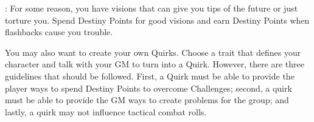 \begin{multicols}{2}
\begin{minipage}{.35\textwidth-2\columnsep}
\end{minipage} \pw \begin{ffcolpage}
: For some reason, you have visions that can give you tips of the future or just torture you. Spend Destiny Points for good visions and earn Destiny Points when flashbacks cause you trouble.
\end{ffcolpage} \pw \begin{ffcolpage}
You may also want to create your own Quirks. Choose a trait that defines your character and talk with your GM to turn into a Quirk. However, there are three guidelines that should be followed. First, a Quirk must be able to provide the player ways to spend Destiny Points to overcome Challenges; second, a quirk must be able to provide the GM ways to create problems for the group; and lastly, a quirk may not influence tactical combat rolls.
\end{ffcolpage}
\end{multicols}

